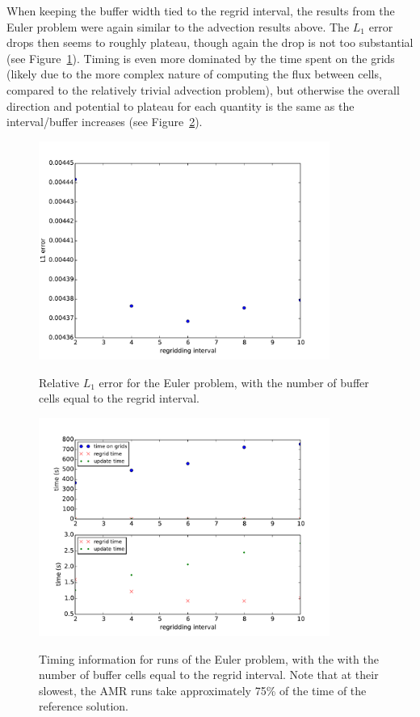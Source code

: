 \documentclass[11pt]{article}
\begin{document}
When keeping the buffer width tied to the regrid interval, the results
from the Euler problem were again similar to the advection results above.
The $L_1$ error drops then seems to roughly plateau, though again the
drop is not too substantial (see Figure~\ref{fig:err_euler}). Timing is
even more dominated by the time spent on the grids (likely due to the more
complex nature of computing the flux between cells, compared to the relatively
trivial advection problem), but otherwise the overall direction and 
potential to plateau for each
quantity is the same as the interval/buffer increases (see 
Figure~\ref{fig:time_euler}).

\begin{figure}[!htb]
\centering
\caption{Relative $L_1$ error for the Euler problem, with the number of
buffer cells equal to the regrid interval.}
\includegraphics[width=0.85\textwidth]{myclaw/l1_err_euler}
\label{fig:err_euler}
\end{figure}

\begin{figure}[!htb]
\centering
\caption{Timing information for runs of the Euler problem, with the
with the number of buffer cells equal to the regrid interval. Note that
at their slowest, the AMR runs take approximately 75\% of the time of the
reference solution.}
\includegraphics[width=0.85\textwidth]{myclaw/time_euler}
\label{fig:time_euler}
\end{figure}
\end{document}
